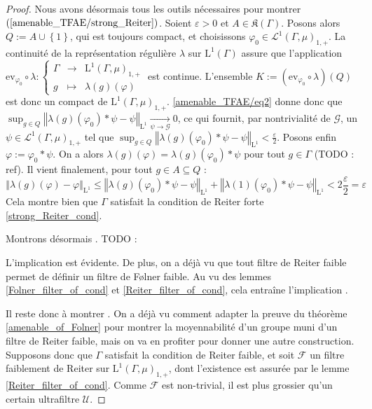 \documentclass[a4paper,12pt]{article}
\newcommand{\ev}{\mathrm{ev}}
\newcommand{\norm}[1]{\left\Vert #1\right\Vert}
\newcommand{\halfilon}{{\frac\varepsilon2}}
\newcommand{\set}[1]{\left\{ #1 \right\}}
\newcommand\fundef[3]{#1: \left\{\begin{array}{ccc}#2\\#3\end{array}\right.}
\newcommand{\comp}{\circ}
\renewcommand{\implies}{\Rightarrow}
\newcommand{\TODO}[1]{{\color{red}TODO :} #1}
\begin{document}
\begin{proof}
    Nous avons désormais tous les outils nécessaires pour montrer $(\ref{amenable_TFAE/strong_Reiter})$. Soient $\varepsilon>0$ et $A\in\mathfrak{K}(\Gamma)$.
    Posons alors $Q := A\cup\set{1}$, qui est toujours compact, et choisissons $\varphi_0\in\mathscr{L}^1(\Gamma, \mu)_{1, +}$. La continuité de la représentation régulière $\lambda$ sur 
    $\mathrm{L}^1(\Gamma)$ assure que l'application $\fundef{\ev_{\varphi_0}\comp\lambda}{\Gamma&\to&\mathrm{L}^1(\Gamma, \mu)_{1, +}}{g&\mapsto&\lambda(g)(\varphi)}$ est continue. 
    L'ensemble $K := (\ev_{\varphi_0}\comp\lambda)(Q)$ est donc un compact de $\mathrm{L}^1(\Gamma, \mu)_{1, +}$. \eqref{amenable_TFAE/eq2} donne donc 
    que $\sup_{g\in Q}\norm{\lambda(g)(\varphi_0)\ast\psi - \psi}_{\mathrm{L}^1} \xrightarrow[\psi\to\mathscr{G}]{} 0$, ce qui fournit, par nontrivialité 
    de $\mathscr{G}$, un $\psi\in\mathscr{L}^1(\Gamma, \mu)_{1, +}$ tel que $\sup_{g\in Q}\norm{\lambda(g)(\varphi_0)\ast\psi - \psi}_{\mathrm{L}^1} < \halfilon$. Posons enfin $\varphi := \varphi_0\ast\psi$.
    On a alors $\lambda(g)(\varphi) = \lambda(g)(\varphi_0)\ast\psi$ pour tout $g\in\Gamma$ (\TODO{ref}). Il vient finalement, pour tout $g\in A\subseteq Q$ : 
    \begin{equation*}
        \norm{\lambda(g)(\varphi) - \varphi}_{\mathrm{L}^1} \leq    
            \norm{\lambda(g)(\varphi_0)\ast\psi - \psi}_{\mathrm{L}^1} + \norm{\lambda(1)(\varphi_0)\ast\psi - \psi}_{\mathrm{L}^1}
            < 2\halfilon = \varepsilon
    \end{equation*}
    Cela montre bien que $\Gamma$ satisfait la condition de Reiter forte \eqref{strong_Reiter_cond}.

    Montrons désormais \framebox{$(\ref{amenable_TFAE/strong_Reiter})\implies(\ref{amenable_TFAE/strong_Folner})$}. \TODO{}

    L'implication \framebox{$(\ref{amenable_TFAE/strong_Folner})\implies(\ref{amenable_TFAE/weak_Folner})$} est évidente.
    De plus, on a déjà vu que tout filtre de Reiter faible permet de définir un filtre de F\o{}lner faible. Au vu des lemmes 
    \ref{Folner_filter_of_cond} et \ref{Reiter_filter_of_cond}, cela entraîne l'implication 
    \framebox{$(\ref{amenable_TFAE/weak_Folner})\implies(\ref{amenable_TFAE/weak_Reiter})$}. 

    Il reste donc à montrer \framebox{$(\ref{amenable_TFAE/weak_Reiter})\implies(\ref{amenable_TFAE/amenable})$}. On a déjà vu comment 
    adapter la preuve du théorème \ref{amenable_of_Folner} pour montrer la moyennabilité d'un groupe muni d'un filtre de Reiter 
    faible, mais on va en profiter pour donner une autre construction. Supposons donc que $\Gamma$ satisfait la condition de Reiter faible,
    et soit $\mathscr{F}$ un filtre faiblement de Reiter sur $\mathrm{L}^1(\Gamma, \mu)_{1, +}$, dont l'existence est assurée par le lemme
    \ref{Reiter_filter_of_cond}. Comme $\mathscr{F}$ est non-trivial, il est plus grossier qu'un certain ultrafiltre $\mathscr{U}$. 


\end{proof}
\end{document}
